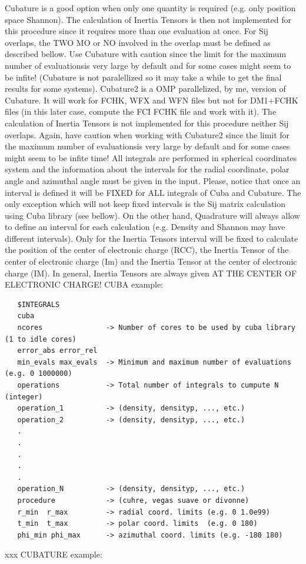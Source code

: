 \documentclass[10pt,a4paper]{article}
\begin{document}
Cubature is a good option when only one quantity is required (e.g. only position space Shannon). The calculation of Inertia Tensors is then not implemented for this procedure since it requires more than one evaluation at once. For Sij overlaps, the TWO MO or NO involved in the overlap must be defined as described bellow. Use Cubature with caution since the limit for the maximum number of evaluationsis very large by default and for some cases might seem to be infite! (Cubature is not paralellized so it may take a while to get the final results for some systems). \newline
Cubature2 is a OMP parallelized, by me, version of Cubature. It will work for FCHK, WFX and WFN files but not for DM1$+$FCHK files (in this later case, compute the FCI FCHK file and work with it). The calculation of Inertia Tensors is not implemented for this procedure neither Sij overlaps. Again, have caution when working with Cubature2 since the limit for the maximum number of evaluationsis very large by default and for some cases might seem to be infite time!\newline
All integrals are performed in spherical coordinates system and the information about the intervals for the radial coordinate, polar angle and azimuthal angle must be given in the input. Please, notice that once an interval is defined it will be FIXED for ALL integrals of Cuba and Cubature. The only exception which will not keep fixed intervals is the Sij matrix calculation using Cuba library (see bellow). On the other hand, Quadrature will always allow to define an interval for each calculation (e.g. Density and Shannon may have different intervals). Only for the Inertia Tensors interval will be fixed to calculate the position of the center of electronic charge (RCC), the Inertia Tensor of the center of electronic charge (Im) and the Inertia Tensor at the center of electronic charge (IM). In general, Inertia Tensors are always given AT THE CENTER OF ELECTRONIC CHARGE!\newline  
\newline
\noindent CUBA example:\newline
\begin{verbatim}
   $INTEGRALS
   cuba
   ncores               -> Number of cores to be used by cuba library (1 to idle cores) 
   error_abs error_rel    
   min_evals max_evals  -> Minimum and maximum number of evaluations (e.g. 0 1000000)
   operations           -> Total number of integrals to cumpute N (integer)
   operation_1          -> (density, densityp, ..., etc.) 
   operation_2          -> (density, densityp, ..., etc.) 
   .
   .
   .
   .
   .
   operation_N          -> (density, densityp, ..., etc.) 
   procedure            -> (cuhre, vegas suave or divonne)
   r_min  r_max         -> radial coord. limits (e.g. 0 1.0e99)
   t_min  t_max         -> polar coord. limits  (e.g. 0 180)
   phi_min phi_max      -> azimuthal coord. limits (e.g. -180 180)
\end{verbatim}
{\color{white} xxx \newline}
\noindent CUBATURE example:\newline
\end{document}
